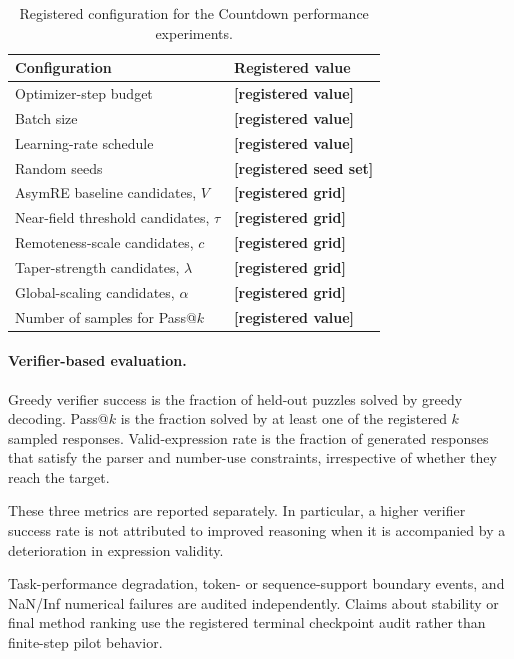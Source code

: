 \documentclass[sigconf,anonymous,review]{acmart}
\theoremstyle{acmdefinition}
\begin{document}
\begin{table}[t]
\centering
\caption{Registered configuration for the Countdown performance experiments.}
\label{tab:countdown_registered_config}

\small
\setlength{\tabcolsep}{8pt}
\renewcommand{\arraystretch}{1.12}

\begin{tabular}{@{}ll@{}}
\toprule
Configuration & Registered value \\
\midrule
Optimizer-step budget
& \textbf{[registered value]} \\
Batch size
& \textbf{[registered value]} \\
Learning-rate schedule
& \textbf{[registered value]} \\
Random seeds
& \textbf{[registered seed set]} \\
AsymRE baseline candidates, $V$
& \textbf{[registered grid]} \\
Near-field threshold candidates, $\tau$
& \textbf{[registered grid]} \\
Remoteness-scale candidates, $c$
& \textbf{[registered grid]} \\
Taper-strength candidates, $\lambda$
& \textbf{[registered grid]} \\
Global-scaling candidates, $\alpha$
& \textbf{[registered grid]} \\
Number of samples for Pass@$k$
& \textbf{[registered value]} \\
\bottomrule
\end{tabular}
\end{table}

\paragraph{Verifier-based evaluation.}

Greedy verifier success is the fraction of held-out puzzles solved by
greedy decoding. Pass@$k$ is the fraction solved by at least one of
the registered \(k\) sampled responses. Valid-expression rate is the
fraction of generated responses that satisfy the parser and number-use
constraints, irrespective of whether they reach the target.

These three metrics are reported separately. In particular, a higher
verifier success rate is not attributed to improved reasoning when it
is accompanied by a deterioration in expression validity.

Task-performance degradation, token- or sequence-support boundary
events, and NaN/Inf numerical failures are audited independently.
Claims about stability or final method ranking use the registered
terminal checkpoint audit rather than finite-step pilot behavior.
\end{document}
